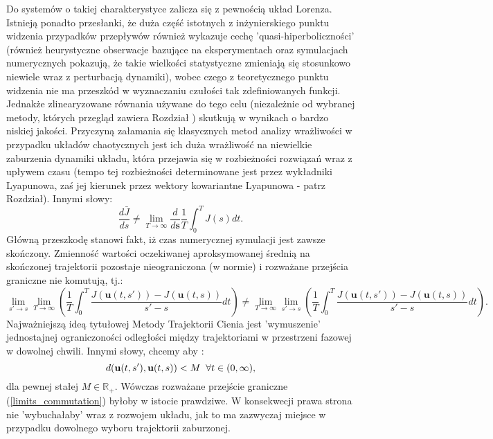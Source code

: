\documentclass[12pt]{article}
\begin{document}
Do systemów o takiej charakterystyce zalicza się z pewnością układ Lorenza. Istnieją ponadto przesłanki, że duża część istotnych z inżynierskiego punktu widzenia przypadków przepływów również wykazuje cechę 'quasi-hiperboliczności' \cite{Qiqi1} (również heurystyczne obserwacje bazujące na eksperymentach oraz symulacjach numerycznych pokazują, że takie wielkości statystyczne zmieniają się stosunkowo niewiele wraz z perturbacją dynamiki), wobec czego z teoretycznego punktu widzenia nie ma przeszkód w wyznaczaniu czułości tak zdefiniowanych funkcji. Jednakże zlinearyzowane równania używane do tego celu (niezależnie od wybranej metody, których przegląd zawiera Rozdział ) skutkują w wynikach o bardzo niskiej jakości. Przyczyną załamania się klasycznych metod analizy wrażliwości w przypadku układów chaotycznych jest ich duża wrażliwość na niewielkie zaburzenia dynamiki układu, która przejawia się w rozbieżności rozwiązań wraz z upływem czasu (tempo tej rozbieżności determinowane jest przez wykładniki Lyapunowa, zaś jej kierunek przez wektory kowariantne Lyapunowa - patrz Rozdział). Innymi słowy: 
\begin{equation}
\frac{d\bar{J}}{ds} 
\neq \lim\limits_{\textit{T}\to\infty}\frac{d}{d\textbf{s}}\frac{1}{T}\int_{0}^{T}J(s)dt.
\label{J_derivative2}
\end{equation}
Główną przeszkodę stanowi fakt, iż czas numerycznej symulacji jest zawsze skończony. Zmienność wartości oczekiwanej aproksymowanej średnią na skończonej trajektorii pozostaje nieograniczona (w normie) i rozważane przejścia graniczne nie komutują, tj.:
\begin{equation} 
\lim\limits_{s'\to s}\lim\limits_{T\to\infty}(\frac{1}{T}\int_{0}^{T}\frac{J(\textbf{u}(t,s'))-J(\textbf{u}(t,s))}{s'-s}dt) \neq \lim\limits_{T\to\infty}\lim\limits_{s'\to s}(\frac{1}{T}\int_{0}^{T}\frac{J(\textbf{u}(t,s'))-J(\textbf{u}(t,s))}{s'-s}dt).
\label{limits_commutation}
\end{equation}
Najważniejszą ideą tytułowej Metody Trajektorii Cienia jest 'wymuszenie' jednostajnej ograniczoności odległości między trajektoriami w przestrzeni fazowej w dowolnej chwili. Innymi słowy, chcemy aby : 
\begin{equation}
d(\textbf{u}(t,s'),\textbf{u}(t,s)) < M \thickspace \thickspace \forall t\in(0,\infty),
\label{uniform_bound}
\end{equation}
dla pewnej stałej $ M \in \mathbb{R}_{+} $. Wówczas rozważane przejście graniczne (\ref{limits_commutation}) byłoby w istocie prawdziwe. W konsekwecji prawa strona nie 'wybuchałaby' wraz z rozwojem układu, jak to ma zazwyczaj miejsce w przypadku dowolnego wyboru trajektorii zaburzonej.
\end{document}
